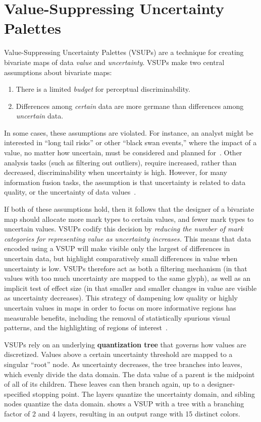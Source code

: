 \section{Value-Suppressing Uncertainty Palettes}
Value-Suppressing Uncertainty Palettes (VSUPs) are a technique for creating bivariate maps of data \emph{value} and \emph{uncertainty}. VSUPs make two central assumptions about bivariate maps:

\begin{enumerate}
	\item There is a limited \emph{budget} for perceptual discriminability.
	\item Differences among \emph{certain} data are more germane than differences among \emph{uncertain} data.
\end{enumerate}

In some cases, these assumptions are violated. For instance, an analyst might be interested in ``long tail risks'' or other ``black swan events,'' where the impact of a value, no matter how uncertain, must be considered and planned for~\cite{taleb2011black}. Other analysis tasks (such as filtering out outliers), require increased, rather than decreased, discriminability when uncertainty is high. However, for many information fusion tasks, the assumption is that uncertainty is related to data quality, or the uncertainty of data values~\cite{riveiro2007evaluation}.

If both of these assumptions hold, then it follows that the designer of a bivariate map should allocate more mark types to certain values, and fewer mark types to uncertain values. VSUPs codify this decision by \emph{reducing the number of mark categories for representing value as uncertainty increases.} This means that data encoded using a VSUP will make visible only the largest of differences in uncertain data, but highlight comparatively small differences in value when uncertainty is low. VSUPs therefore act as both a filtering mechanism (in that values with too much uncertainty are mapped to the same glyph), as well as an implicit test of effect size (in that smaller and smaller changes in value are visible as uncertainty decreases). This strategy of dampening low quality or highly uncertain values in maps in order to focus on more informative regions has measurable benefits, including the removal of statistically spurious visual patterns, and the highlighting of regions of interest~\cite{correll2017surprise}.

VSUPs rely on an underlying \textbf{quantization tree} that governs how values are discretized. Values above a certain uncertainty threshold are mapped to a singular ``root'' node. As uncertainty decreases, the tree branches into leaves, which evenly divide the data domain. The data value of a parent is the midpoint of all of its children. These leaves can then branch again, up to a designer-specified stopping point. The layers quantize the uncertainty domain, and sibling nodes quantize the data domain.  shows a VSUP with a tree with a branching factor of 2 and 4 layers, resulting in an output range with 15 distinct colors.

